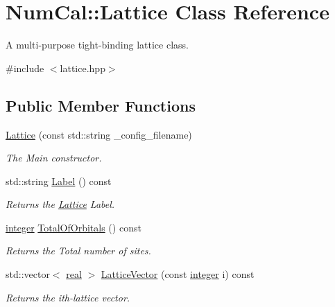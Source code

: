 \hypertarget{classNumCal_1_1Lattice}{\section{Num\+Cal\+:\+:Lattice Class Reference}
\label{classNumCal_1_1Lattice}
}


A multi-\/purpose tight-\/binding lattice class.  




{\ttfamily \#include $<$lattice.\+hpp$>$}

\subsection*{Public Member Functions}
\begin{DoxyCompactItemize}
\item 
\hyperlink{classNumCal_1_1Lattice_a2e6c128581ceefebc192931cade39a16}{Lattice} (const std\+::string \+\_\+config\+\_\+filename)
\begin{DoxyCompactList}\small\item\em The Main constructor. \end{DoxyCompactList}\item 
std\+::string \hyperlink{classNumCal_1_1Lattice_aaf8e70c4bbd604a11d1e3238c136ddd8}{Label} () const 
\begin{DoxyCompactList}\small\item\em Returns the \hyperlink{classNumCal_1_1Lattice}{Lattice} Label. \end{DoxyCompactList}\item 
\hyperlink{namespaceNumCal_ae1031b42812e871d8f5bd9b7b15fc7d8}{integer} \hyperlink{classNumCal_1_1Lattice_adde86747cce019e4f8a0920a27cd13bb}{Total\+Of\+Orbitals} () const 
\begin{DoxyCompactList}\small\item\em Returns the Total number of sites. \end{DoxyCompactList}\item 
std\+::vector$<$ \hyperlink{namespaceNumCal_ac10564761316cff6fb75fe8bfccd6def}{real} $>$ \hyperlink{classNumCal_1_1Lattice_aed4b75342080f04b580eda4a0ed374c2}{Lattice\+Vector} (const \hyperlink{namespaceNumCal_ae1031b42812e871d8f5bd9b7b15fc7d8}{integer} i) const 
\begin{DoxyCompactList}\small\item\em Returns the ith-\/lattice vector. \end{DoxyCompactList}\item 

\end{DoxyCompactItemize}
